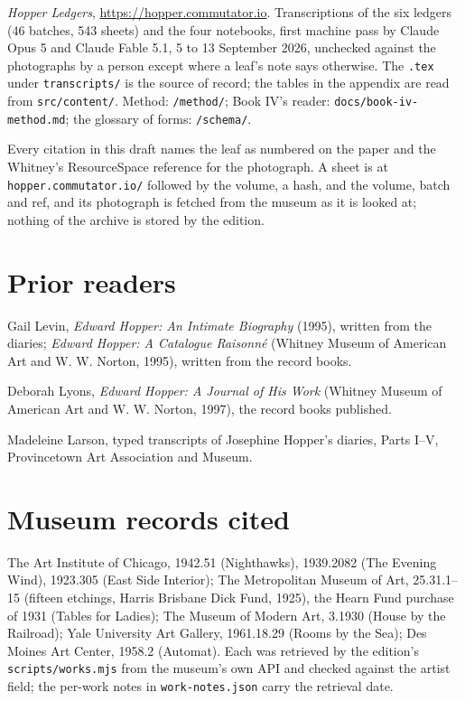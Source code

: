 \emph{Hopper Ledgers}, \url{https://hopper.commutator.io}. Transcriptions of the six ledgers (46 batches, 543 sheets) and the four notebooks, first machine pass by Claude Opus 5 and Claude Fable 5.1, 5 to 13 September 2026, unchecked against the photographs by a person except where a leaf's note says otherwise. The \texttt{.tex} under \texttt{transcripts/} is the source of record; the tables in the appendix are read from \texttt{src/content/}. Method: \texttt{/method/}; Book IV's reader: \texttt{docs/book-iv-method.md}; the glossary of forms: \texttt{/schema/}.

Every citation in this draft names the leaf as numbered on the paper and the Whitney's ResourceSpace reference for the photograph. A sheet is at \texttt{hopper.commutator.io/} followed by the volume, a hash, and the volume, batch and ref, and its photograph is fetched from the museum as it is looked at; nothing of the archive is stored by the edition.

\section*{Prior readers}

Gail Levin, \emph{Edward Hopper: An Intimate Biography} (1995), written from the diaries; \emph{Edward Hopper: A Catalogue Raisonné} (Whitney Museum of American Art and W. W. Norton, 1995), written from the record books.

Deborah Lyons, \emph{Edward Hopper: A Journal of His Work} (Whitney Museum of American Art and W. W. Norton, 1997), the record books published.

Madeleine Larson, typed transcripts of Josephine Hopper's diaries, Parts I--V, Provincetown Art Association and Museum.

\section*{Museum records cited}

The Art Institute of Chicago, 1942.51 (Nighthawks), 1939.2082 (The Evening Wind), 1923.305 (East Side Interior); The Metropolitan Museum of Art, 25.31.1--15 (fifteen etchings, Harris Brisbane Dick Fund, 1925), the Hearn Fund purchase of 1931 (Tables for Ladies); The Museum of Modern Art, 3.1930 (House by the Railroad); Yale University Art Gallery, 1961.18.29 (Rooms by the Sea); Des Moines Art Center, 1958.2 (Automat). Each was retrieved by the edition's \texttt{scripts/works.mjs} from the museum's own API and checked against the artist field; the per-work notes in \texttt{work-notes.json} carry the retrieval date.
